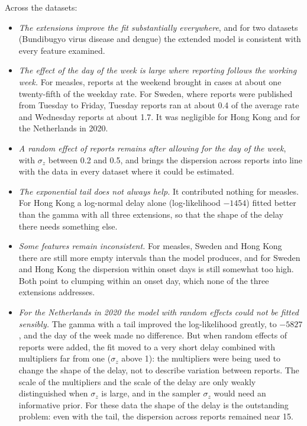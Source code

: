 \documentclass[11pt,a4paper]{article}
\begin{document}
Across the datasets:
\begin{itemize}[itemsep=2pt]
\item \emph{The extensions improve the fit substantially everywhere}, and for
two datasets (Bundibugyo virus disease and dengue) the extended model is
consistent with every feature examined.
\item \emph{The effect of the day of the week is large where reporting follows
the working week.} For measles, reports at the weekend brought in cases at
about one twenty-fifth of the weekday rate. For Sweden, where reports were
published from Tuesday to Friday, Tuesday reports ran at about 0.4 of the
average rate and Wednesday reports at about 1.7. It was negligible for Hong
Kong and for the Netherlands in 2020.
\item \emph{A random effect of reports remains after allowing for the day of
the week}, with $\sigma_z$ between 0.2 and 0.5, and brings the dispersion
across reports into line with the data in every dataset where it could be
estimated.
\item \emph{The exponential tail does not always help.} It contributed nothing
for measles. For Hong Kong a log-normal delay alone (log-likelihood $-1454$)
fitted better than the gamma with all three extensions, so that the shape of
the delay there needs something else.
\item \emph{Some features remain inconsistent.} For measles, Sweden and Hong
Kong there are still more empty intervals than the model produces, and for
Sweden and Hong Kong the dispersion within onset days is still somewhat too
high. Both point to clumping within an onset day, which none of the three
extensions addresses.
\item \emph{For the Netherlands in 2020 the model with random effects could
not be fitted sensibly.} The gamma with a tail improved the log-likelihood
greatly, to $-5827$, and the day of the week made no difference. But when
random effects of reports were added, the fit moved to a very short delay
combined with multipliers far from one ($\sigma_z$ above 1): the multipliers
were being used to change the shape of the delay, not to describe variation
between reports. The scale of the multipliers and the scale of the delay are
only weakly distinguished when $\sigma_z$ is large, and in the sampler
$\sigma_z$ would need an informative prior. For these data the shape of the
delay is the outstanding problem: even with the tail, the dispersion across
reports remained near 15.
\end{itemize}
\end{document}
